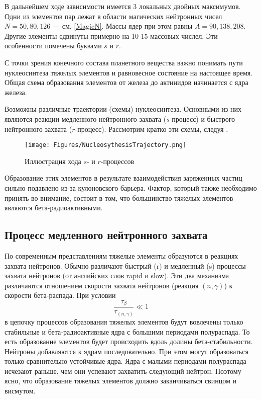 \documentclass[a5paper,openany]{book}
\begin{document}
В дальнейшем ходе зависимости имеется 3 локальных двойных максимумов. Одни из элементов пар лежат в области магических нейтронных чисел $N = 50, 80, 126$ --- см. \eqref{MagicN}. Массы ядер при этом равны $A = 90, 138, 208$. Другие элементы сдвинуты примерно на 10-15 массовых числел. Эти особенности помечены  буквами $s$ и $r$.

С точки зрения конечного состава планетного вещества важно понимать пути нуклеосинтеза тяжелых элементов и равновесное состояние на настоящее время. Общая схема образования элементов от железа до актинидов начинается с ядра железа.


Возможны различные траектории (схемы) нуклеосинтеза. Основными из них являются реакции  медленного нейтронного захвата ($s$-процесс) и быстрого нейтронного захвата ($r$-процесс). Рассмотрим кратко эти схемы, следуя \cite{Nucleosynthesis, ElementsOrigin}.

\begin{figure}[ht] 
	\centering\small
	\unitlength=1mm
	\texttt{[image: Figures/NucleosythesisTrajectory.png]} 
	\caption{Иллюстрация хода $s$- и $r$-процессов \cite{ElementsOrigin}} 
	\label{f:NucleosythesisTrajector}
\end{figure}

Образование этих элементов в результате взаимодействия заряженных частиц сильно подавлено из-за кулоновского барьера. Фактор, который также необходимо принять во внимание, состоит в том, что большинство тяжелых элементов являются бета-радиоактивными.

\subsection{Процесс медленного нейтронного захвата} 

По современным представлениям тяжелые элементы образуются в реакциях захвата нейтронов. Обычно различают быстрый (r) и медленный (s) процессы захвата нейтронов (от английских слов rapid и slow). Эти два механизма различаются отношением скорости захвата нейтронов (реакция $(n, \gamma)$) к скорости бета-распада. При условии 
\begin{equation}\label{sprocess}
	\frac{\tau_{\beta}} {\tau_{(n, \gamma)}}  \ll  1 
\end{equation}
в цепочку процессов образования тяжелых элементов будут вовлечены только стабильные и бета-радиоактивные ядра с большими периодами полураспада. То есть образование элементов будет происходить вдоль долины бета-стабильности. Нейтроны добавляются к ядрам последовательно. При этом могут образоваться только сравнительно устойчивые ядра. Ядра с малыми периодами полураспада исчезают раньше, чем они успевают захватить следующий нейтрон. Поэтому ясно, что образование тяжелых элементов должно заканчиваться свинцом и висмутом.
\end{document}
